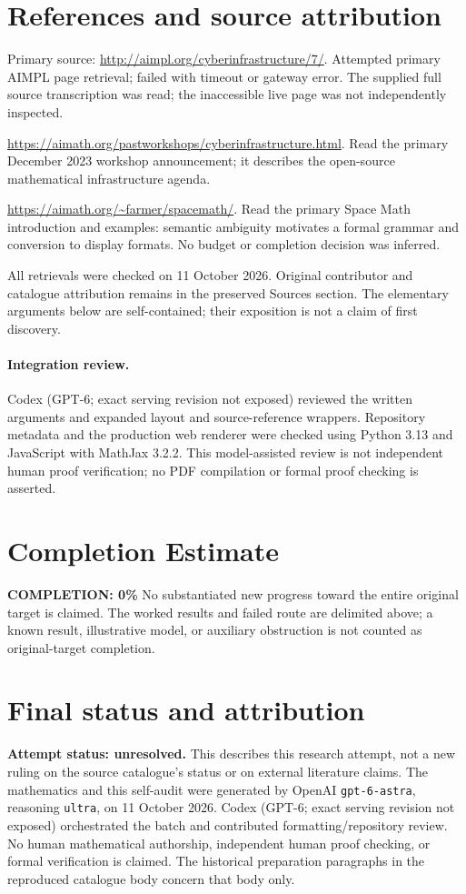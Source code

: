 \documentclass[11pt]{article}
\begin{document}
\section{References and source attribution}
Primary source: \url{http://aimpl.org/cyberinfrastructure/7/}. Attempted primary AIMPL page retrieval; failed with timeout or gateway error. The supplied full source transcription was read; the inaccessible live page was not independently inspected.

\url{https://aimath.org/pastworkshops/cyberinfrastructure.html}. Read the primary December 2023 workshop announcement; it describes the open-source mathematical infrastructure agenda.

\url{https://aimath.org/~farmer/spacemath/}. Read the primary Space Math introduction and examples: semantic ambiguity motivates a formal grammar and conversion to display formats. No budget or completion decision was inferred.

All retrievals were checked on 11 October 2026. Original contributor and catalogue attribution remains in the preserved Sources section. The elementary arguments below are self-contained; their exposition is not a claim of first discovery.


\paragraph{Integration review.} Codex (GPT-6; exact serving revision not exposed) reviewed the written arguments and expanded layout and source-reference wrappers. Repository metadata and the production web renderer were checked using Python 3.13 and JavaScript with MathJax 3.2.2. This model-assisted review is not independent human proof verification; no PDF compilation or formal proof checking is asserted.

\section{Completion Estimate}
\noindent\textbf{COMPLETION: 0\%}
No substantiated new progress toward the entire original target is claimed. The worked results and failed route are delimited above; a known result, illustrative model, or auxiliary obstruction is not counted as original-target completion.

\section{Final status and attribution}
\textbf{Attempt status: unresolved.} This describes this research attempt, not a new ruling on the source catalogue's status or on external literature claims.
The mathematics and this self-audit were generated by OpenAI \texttt{gpt-6-astra}, reasoning \texttt{ultra}, on 11 October 2026. Codex (GPT-6; exact serving revision not exposed) orchestrated the batch and contributed formatting/repository review. No human mathematical authorship, independent human proof checking, or formal verification is claimed. The historical preparation paragraphs in the reproduced catalogue body concern that body only.
\end{document}
